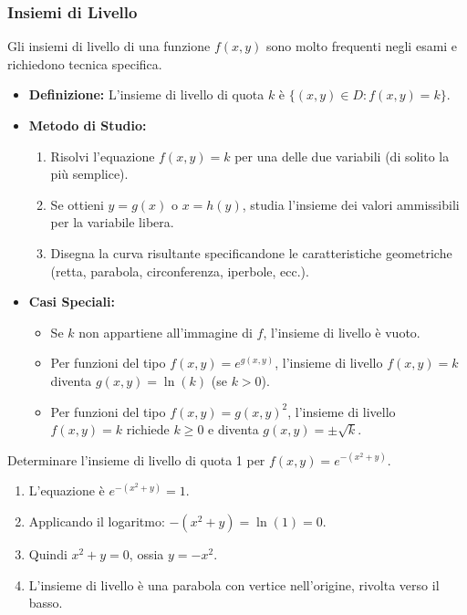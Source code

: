 \documentclass[a4paper, 12pt]{article}
\begin{document}
\subsubsection{Insiemi di Livello}
Gli insiemi di livello di una funzione \(f(x,y)\) sono molto frequenti negli esami e richiedono tecnica specifica.

\begin{itemize}
    \item \textbf{Definizione:} L'insieme di livello di quota \(k\) è \(\{(x,y) \in D : f(x,y) = k\}\).
    \item \textbf{Metodo di Studio:}
    \begin{enumerate}
        \item Risolvi l'equazione \(f(x,y) = k\) per una delle due variabili (di solito la più semplice).
        \item Se ottieni \(y = g(x)\) o \(x = h(y)\), studia l'insieme dei valori ammissibili per la variabile libera.
        \item Disegna la curva risultante specificandone le caratteristiche geometriche (retta, parabola, circonferenza, iperbole, ecc.).
    \end{enumerate}
    \item \textbf{Casi Speciali:}
    \begin{itemize}
        \item Se \(k\) non appartiene all'immagine di \(f\), l'insieme di livello è vuoto.
        \item Per funzioni del tipo \(f(x,y) = e^{g(x,y)}\), l'insieme di livello \(f(x,y) = k\) diventa \(g(x,y) = \ln(k)\) (se \(k > 0\)).
        \item Per funzioni del tipo \(f(x,y) = g(x,y)^2\), l'insieme di livello \(f(x,y) = k\) richiede \(k \geq 0\) e diventa \(g(x,y) = \pm\sqrt{k}\).
    \end{itemize}
\end{itemize}

\begin{esempio}
Determinare l'insieme di livello di quota 1 per \(f(x,y) = e^{-(x^2+y)}\).
\begin{enumerate}
    \item L'equazione è \(e^{-(x^2+y)} = 1\).
    \item Applicando il logaritmo: \(-(x^2+y) = \ln(1) = 0\).
    \item Quindi \(x^2 + y = 0\), ossia \(y = -x^2\).
    \item L'insieme di livello è una parabola con vertice nell'origine, rivolta verso il basso.
\end{enumerate}
\end{esempio}
\end{document}
